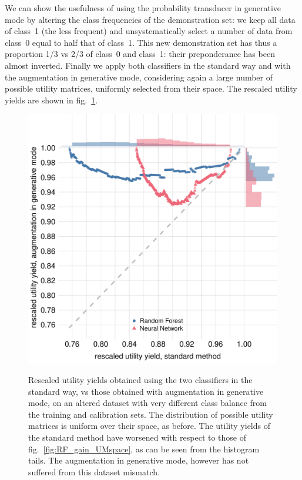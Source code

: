 \documentclass[\ifafour a4paper,12pt,\else a5paper,10pt,\fi%
onecolumn,oneside,article,%
british%
]{memoir}
\theoremstyle{remark}
\theoremstyle{innote}
\renewcommand*{\|}[1][]{\nonscript\:#1\vert\nonscript\:\mathopen{}}
\newcommand*{\fig}{fig.}%
\begin{document}
We can show the usefulness of using the probability transducer in generative mode by altering the class frequencies of the demonstration set: we keep all data of class~1 (the less frequent) and unsystematically select a number of data from class~0 equal to half that of class~1. This new demonstration set has thus a proportion 1/3 vs 2/3 of class~0 and class~1: their preponderance has been almost inverted. Finally we apply both classifiers in the standard way and with the augmentation in generative mode, considering again a large number of possible utility matrices, uniformly selected from their space. The rescaled utility yields are shown in \fig~\ref{fig:genRF_gain_UMspace}.
  \begin{figure}[!t]
  \centering
  \includegraphics[width=\linewidth]{genRFCNN_transducer_gains_histograms.pdf}\\
  \caption{Rescaled utility yields obtained using the two classifiers in the standard way, vs those obtained with augmentation in generative mode, on an altered dataset with very different class balance from the training and calibration sets.
The distribution of possible utility matrices is  uniform over their space, as before. The utility yields of the standard method have worsened with respect to those of \fig~\ref{fig:RF_gain_UMspace}, as can be seen from the histogram tails. The augmentation in generative mode, however has not suffered from this dataset mismatch.}
  \label{fig:genRF_gain_UMspace}
\end{figure}
\end{document}
